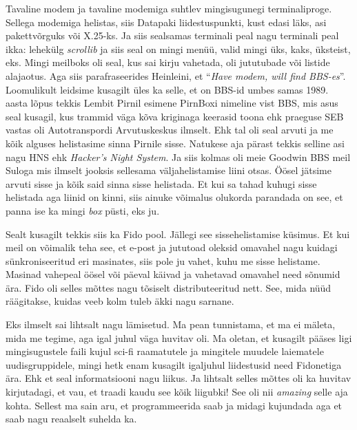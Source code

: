 
Tavaline modem ja tavaline modemiga suhtlev mingisugunegi terminaliproge. Sellega modemiga helistas, siis Datapaki liidestuspunkti, kust edasi läks, asi pakettvõrguks või X.25-ks. Ja siis sealsamas terminali peal nagu terminali peal ikka: lehekülg \emph{scrollib} ja siis seal on mingi menüü, valid mingi üks, kaks, üksteist, eks. Mingi meilboks oli seal, kus sai kirju vahetada, oli  jututubade või listide alajaotus. Aga siis  parafraseerides Heinleini, et \enquote{\emph{Have modem, will find BBS-es}}. Loomulikult leidsime kusagilt üles ka selle, et on  BBS-id umbes samas 1989. aasta lõpus tekkis Lembit Pirnil esimene PirnBoxi nimeline vist BBS, mis asus seal kusagil, kus trammid väga kõva kriginaga keerasid toona ehk  praeguse SEB vastas oli Autotranspordi Arvutuskeskus ilmselt. Ehk tal oli seal arvuti ja me kõik alguses helistasime  sinna Pirnile sisse. Natukese aja pärast tekkis selline asi nagu HNS ehk \emph{Hacker's Night System}. Ja siis kolmas oli meie Goodwin BBS meil Suloga mis  ilmselt jooksis sellesama väljahelistamise liini otsas. Öösel jätsime  arvuti sisse ja kõik said sinna sisse helistada. Et kui sa tahad kuhugi sisse helistada aga liinid on kinni, siis ainuke võimalus olukorda parandada on see, et panna ise ka mingi \emph{box} püsti, eks ju. 

Sealt kusagilt tekkis siis ka Fido pool. Jällegi see sissehelistamise küsimus. Et kui meil on  võimalik teha see, et e-post ja jututoad oleksid omavahel nagu kuidagi  sünkroniseeritud eri masinates, siis pole ju vahet, kuhu me sisse helistame. Masinad vahepeal öösel või päeval käivad ja vahetavad omavahel need sõnumid ära. Fido oli selles mõttes nagu tõsiselt distributeeritud nett. See, mida nüüd räägitakse, kuidas  veeb kolm tuleb äkki nagu sarnane. 


Eks ilmselt sai lihtsalt nagu lämisetud. Ma pean tunnistama, et ma ei mäleta, mida me  tegime, aga igal juhul väga huvitav oli. Ma oletan, et kusagilt  pääses ligi mingisugustele faili kujul sci-fi  raamatutele ja mingitele muudele laiematele uudisgruppidele, mingi hetk enam kusagilt igaljuhul liidestusid need Fidonetiga ära. Ehk et seal informatsiooni nagu liikus. Ja lihtsalt selles mõttes oli ka huvitav kirjutadagi, et vau, et traadi kaudu see kõik liigubki! See oli nii \emph{amazing} selle aja kohta. Sellest ma sain aru, et programmeerida saab ja midagi kujundada aga et saab nagu  reaalselt suhelda ka.

